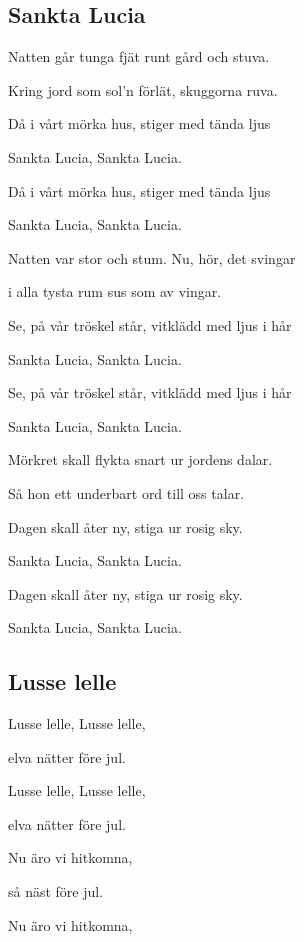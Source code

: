 

\pagestyle{Julvisor}



\subsection{\textbf{Sankta Lucia}}

Natten går tunga fjät runt gård och stuva.

Kring jord som sol'n förlät, skuggorna ruva.

Då i vårt mörka hus, stiger med tända ljus

Sankta Lucia, Sankta Lucia.

Då i vårt mörka hus, stiger med tända ljus

Sankta Lucia, Sankta Lucia.\bigskip

Natten var stor och stum. Nu, hör, det svingar

i alla tysta rum sus som av vingar.

Se, på vår tröskel står, vitklädd med ljus i hår

Sankta Lucia, Sankta Lucia.

Se, på vår tröskel står, vitklädd med ljus i hår

Sankta Lucia, Sankta Lucia.\bigskip

Mörkret skall flykta snart ur jordens dalar.

Så hon ett underbart ord till oss talar.

Dagen skall åter ny, stiga ur rosig sky.

Sankta Lucia, Sankta Lucia.

Dagen skall åter ny, stiga ur rosig sky.

Sankta Lucia, Sankta Lucia. \bigskip

\subsection{\textbf{Lusse lelle}}

Lusse lelle, Lusse lelle,

elva nätter före jul.

Lusse lelle, Lusse lelle,

elva nätter före jul.

Nu äro vi hitkomna,

så näst före jul.

Nu äro vi hitkomna,

